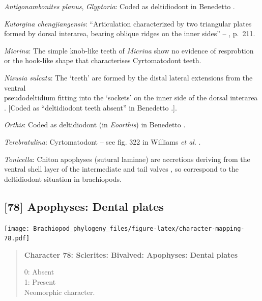 \documentclass[openany]{book}
\begin{document}
\hypertarget{Antigonambonites_planus-coding-77}{}
\emph{Antigonambonites planus}, \emph{Glyptoria}: Coded as deltidiodont
in Benedetto \citeyearpar{Benedetto2009iChaniella}.

\hypertarget{Kutorgina_chengjiangensis-coding-77}{}
\emph{Kutorgina chengjiangensis}: ``Articulation characterized by two
triangular plates formed by dorsal interarea, bearing oblique ridges on
the inner sides'' -- \citet{Williams2000LinguliformeaCraniiformea},
p.~211.

\hypertarget{Micrina-coding-77}{}
\emph{Micrina}: The simple knob-like teeth of \emph{Micrina} show no
evidence of resprobtion or the hook-like shape that characterises
Cyrtomatodont teeth.

\hypertarget{Nisusia_sulcata-coding-77}{}
\emph{Nisusia sulcata}: The `teeth' are formed by the distal lateral
extensions from the ventral\\
pseudodeltidium fitting into the `sockets' on the inner side of the
dorsal interarea \citep{Holmer2018Evolutionarysignificance}. {[}Coded as
``deltidiodont teeth absent'' in Benedetto
\citeyearpar{Benedetto2009iChaniella}.{]}.

\hypertarget{Orthis-coding-77}{}
\emph{Orthis}: Coded as deltidiodont (in \emph{Eoorthis}) in Benedetto
\citeyearpar{Benedetto2009iChaniella}.

\hypertarget{Terebratulina-coding-77}{}
\emph{Terebratulina}: Cyrtomatodont -- see fig. 322 in Williams \emph{et
al}. \citeyearpar{Williams2000LinguliformeaCraniiformea}.

\hypertarget{Tonicella-coding-77}{}
\emph{Tonicella}: Chiton apophyses (sutural laminae) are accretions
deriving from the ventral shell layer of the intermediate and tail
valves \citep{Schwabe2010}, so correspond to the deltidiodont situation
in brachiopods.

\subsection*{{[}78{]} Apophyses: Dental
plates}\label{apophyses-dental-plates}

\texttt{[image: Brachiopod\_phylogeny\_files/figure-latex/character-mapping-78.pdf]}

\begin{quote}
\textbf{Character 78: Sclerites: Bivalved: Apophyses: Dental plates}

0: Absent\\
1: Present\\
Neomorphic character.
\end{quote}
\end{document}
